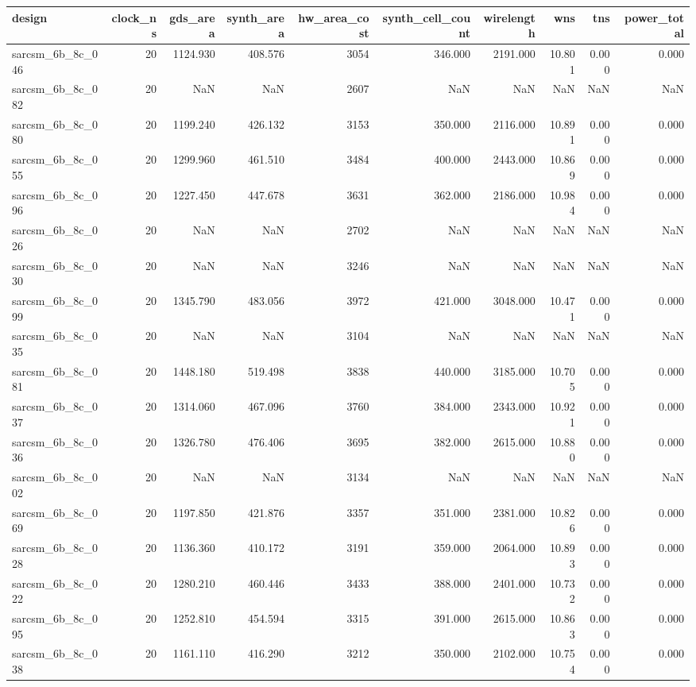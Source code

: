 \begin{tabular}{lrrrrrrrrr}
\toprule
design & clock\_ns & gds\_area & synth\_area & hw\_area\_cost & synth\_cell\_count & wirelength & wns & tns & power\_total \\
\midrule
sarcsm\_6b\_8c\_046 & 20 & 1124.930 & 408.576 & 3054 & 346.000 & 2191.000 & 10.801 & 0.000 & 0.000 \\
sarcsm\_6b\_8c\_082 & 20 & NaN & NaN & 2607 & NaN & NaN & NaN & NaN & NaN \\
sarcsm\_6b\_8c\_080 & 20 & 1199.240 & 426.132 & 3153 & 350.000 & 2116.000 & 10.891 & 0.000 & 0.000 \\
sarcsm\_6b\_8c\_055 & 20 & 1299.960 & 461.510 & 3484 & 400.000 & 2443.000 & 10.869 & 0.000 & 0.000 \\
sarcsm\_6b\_8c\_096 & 20 & 1227.450 & 447.678 & 3631 & 362.000 & 2186.000 & 10.984 & 0.000 & 0.000 \\
sarcsm\_6b\_8c\_026 & 20 & NaN & NaN & 2702 & NaN & NaN & NaN & NaN & NaN \\
sarcsm\_6b\_8c\_030 & 20 & NaN & NaN & 3246 & NaN & NaN & NaN & NaN & NaN \\
sarcsm\_6b\_8c\_099 & 20 & 1345.790 & 483.056 & 3972 & 421.000 & 3048.000 & 10.471 & 0.000 & 0.000 \\
sarcsm\_6b\_8c\_035 & 20 & NaN & NaN & 3104 & NaN & NaN & NaN & NaN & NaN \\
sarcsm\_6b\_8c\_081 & 20 & 1448.180 & 519.498 & 3838 & 440.000 & 3185.000 & 10.705 & 0.000 & 0.000 \\
sarcsm\_6b\_8c\_037 & 20 & 1314.060 & 467.096 & 3760 & 384.000 & 2343.000 & 10.921 & 0.000 & 0.000 \\
sarcsm\_6b\_8c\_036 & 20 & 1326.780 & 476.406 & 3695 & 382.000 & 2615.000 & 10.880 & 0.000 & 0.000 \\
sarcsm\_6b\_8c\_002 & 20 & NaN & NaN & 3134 & NaN & NaN & NaN & NaN & NaN \\
sarcsm\_6b\_8c\_069 & 20 & 1197.850 & 421.876 & 3357 & 351.000 & 2381.000 & 10.826 & 0.000 & 0.000 \\
sarcsm\_6b\_8c\_028 & 20 & 1136.360 & 410.172 & 3191 & 359.000 & 2064.000 & 10.893 & 0.000 & 0.000 \\
sarcsm\_6b\_8c\_022 & 20 & 1280.210 & 460.446 & 3433 & 388.000 & 2401.000 & 10.732 & 0.000 & 0.000 \\
sarcsm\_6b\_8c\_095 & 20 & 1252.810 & 454.594 & 3315 & 391.000 & 2615.000 & 10.863 & 0.000 & 0.000 \\
sarcsm\_6b\_8c\_038 & 20 & 1161.110 & 416.290 & 3212 & 350.000 & 2102.000 & 10.754 & 0.000 & 0.000 \\

\end{tabular}
